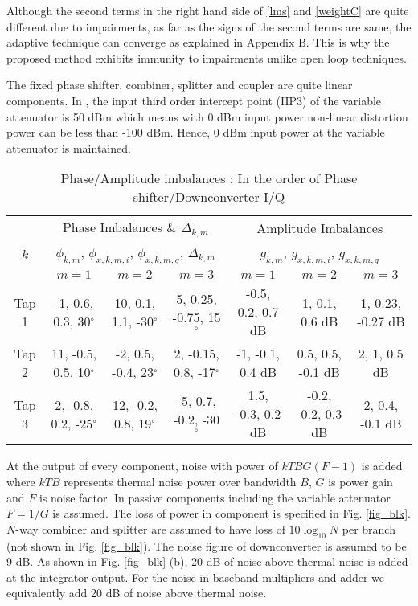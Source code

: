 \documentclass[twocolumn]{IEEEtran}
\begin{document}
Although the second terms in the right hand side of \eqref{lms} and
\eqref{weightC} are quite different due to impairments, as far as
the signs of the second terms are same, the adaptive technique can
converge as explained in Appendix B. This is why the proposed method
exhibits immunity to impairments unlike open loop techniques.

The fixed phase shifter, combiner, splitter and coupler are quite
linear components. In \cite{rfmd}, the input third order intercept
point (IIP3) of the variable attenuator is 50 dBm which means with 0
dBm input power non-linear distortion power can be less than -100
dBm. Hence, 0 dBm input power at the variable attenuator is
maintained.

\begin{center}
\begin{table*}[ht]
\centering \caption{Phase/Amplitude imbalances : In the order of
Phase shifter/Downconverter I/Q}
\begin{small}
\begin{tabular}{c||c|c|c||c|c|c}
\hline
  \hline
&\multicolumn{3}{c||}{Phase Imbalances \& $\Delta_{k,m}$}  &\multicolumn{3}{c}{Amplitude Imbalances}  \\
$k$ &\multicolumn{3}{c||}{$\phi_{k,m}$, $\phi_{x,k,m,i}$, $\phi_{x,k,m,q}$, $\Delta_{k,m}$}  &\multicolumn{3}{c}{$g_{k,m}$, $g_{x,k,m,i}$, $g_{x,k,m,q}$}  \\
  \cline{2-7}
  & $m=1$ & $m=2$ & $m=3$ & $m=1$ & $m=2$ & $m=3$   \\
  \hline
  \hline
  Tap 1 & -1, 0.6, 0.3, 30$^\circ$ & 10, 0.1, 1.1, -30$^\circ$ & 5, 0.25, -0.75, 15$^\circ$ & -0.5, 0.2, 0.7 dB  & 1, 0.1, 0.6 dB & 1, 0.23, -0.27 dB   \\
  Tap 2 & 11, -0.5, 0.5, 10$^\circ$ & -2, 0.5, -0.4, 23$^\circ$ & 2, -0.15, 0.8, -17$^\circ$ & -1, -0.1, 0.4 dB  & 0.5, 0.5, -0.1 dB & 2, 1, 0.5 dB   \\
  Tap 3 & 2, -0.8, 0.2, -25$^\circ$ & 12, -0.2, 0.8, 19$^\circ$ & -5, 0.7, -0.2, -30$^\circ$ & 1.5, -0.3, 0.2 dB  &-0.2, -0.2, 0.3 dB & 2, 0.4, -0.1 dB   \\
  \hline
  \hline
\end{tabular}
\end{small}
\end{table*}
\end{center}
At the output of every component, noise with power of $kTBG(F-1)$ is
added where $kTB$ represents thermal noise power over bandwidth $B$,
$G$ is power gain and $F$ is noise factor. In passive components
including the variable attenuator $F=1/G$ is assumed. The loss of
power in component is specified in Fig. \ref{fig_blk}. $N$-way
combiner and splitter are assumed to have loss of $10\log_{10} N$
per branch (not shown in Fig. \ref{fig_blk}). The noise figure of
downconverter is assumed to be 9 dB. As shown in Fig. \ref{fig_blk}
(b), 20 dB of noise above thermal noise is added at the integrator
output. For the noise in baseband multipliers and adder we
equivalently add 20 dB of noise above thermal noise.
\end{document}
